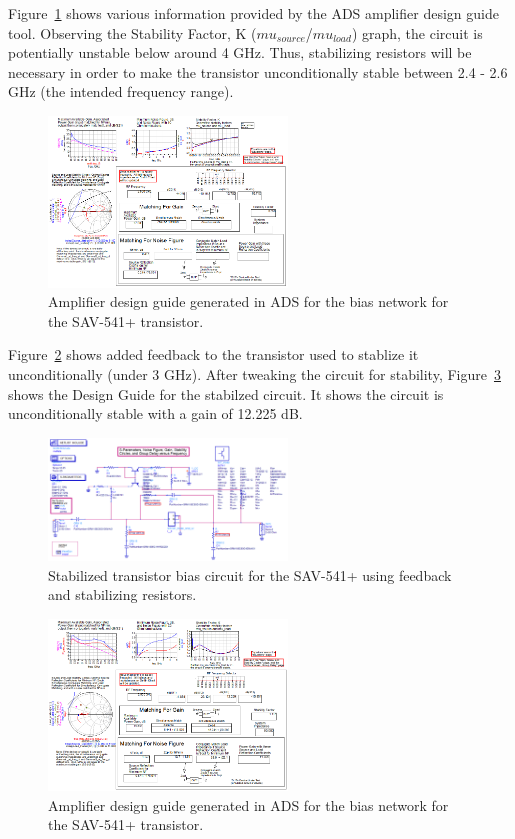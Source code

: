 \documentclass[conference]{IEEEtran}
\begin{document}
Figure~\ref{fig:designguide} shows various information provided by the ADS amplifier design guide tool.  Observing the Stability Factor, K ($mu_{source}$/$mu_{load}$) graph, the circuit is potentially unstable below around 4 GHz.  Thus, stabilizing resistors will be necessary in order to make the transistor unconditionally stable between 2.4 - 2.6 GHz (the intended frequency range).

\begin{figure}[!h]
\centering
\includegraphics[width=2.5in]{pics/DesignGuideUnoptimized.png}
\caption{Amplifier design guide generated in ADS for the bias network for the SAV-541+ transistor.}
\label{fig:designguide}
\end{figure}

Figure~\ref{fig:designcuidecircuitstabilized} shows added feedback to the transistor used to stablize it unconditionally (under 3 GHz).  After tweaking the circuit for stability, Figure~\ref{fig:designcuidesimulationstabilized} shows the Design Guide for the stabilzed circuit. It shows the circuit is unconditionally stable with a gain of 12.225 dB.

\begin{figure}[!h]
\centering
\includegraphics[width=2.5in]{pics/DesignGuideStablizedCircuit.png}
\caption{Stabilized transistor bias circuit for the SAV-541+ using feedback and stabilizing resistors.}
\label{fig:designcuidecircuitstabilized}
\end{figure}

\begin{figure}[!h]
\centering
\includegraphics[width=2.5in]{pics/DesignGuideStablizedSimulation.png}
\caption{Amplifier design guide generated in ADS for the bias network for the SAV-541+ transistor.}
\label{fig:designcuidesimulationstabilized}
\end{figure}
\end{document}

